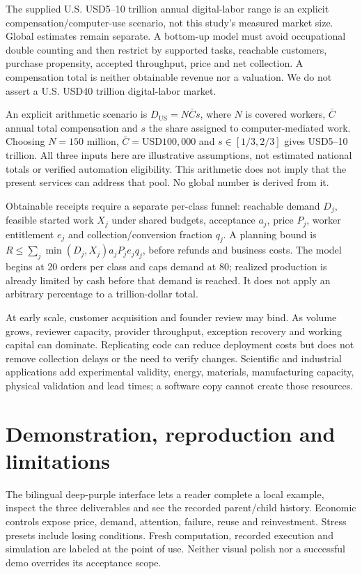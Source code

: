 \documentclass[11pt,a4paper]{article}
\begin{document}
The supplied U.S. USD5--10 trillion annual digital-labor range is an explicit compensation/computer-use scenario, not this study's measured market size. Global estimates remain separate. A bottom-up model must avoid occupational double counting and then restrict by supported tasks, reachable customers, purchase propensity, accepted throughput, price and net collection. A compensation total is neither obtainable revenue nor a valuation. We do not assert a U.S. USD40 trillion digital-labor market.

An explicit arithmetic scenario is $D_{\mathrm{US}}=N\bar C s$, where $N$ is covered workers, $\bar C$ annual total compensation and $s$ the share assigned to computer-mediated work. Choosing $N=150$ million, $\bar C=\mathrm{USD}100{,}000$ and $s\in[1/3,2/3]$ gives USD5--10 trillion. All three inputs here are illustrative assumptions, not estimated national totals or verified automation eligibility. This arithmetic does not imply that the present services can address that pool. No global number is derived from it.

Obtainable receipts require a separate per-class funnel: reachable demand $D_j$, feasible started work $X_j$ under shared budgets, acceptance $a_j$, price $P_j$, worker entitlement $e_j$ and collection/conversion fraction $q_j$. A planning bound is $R\leq\sum_j \min(D_j,X_j)a_jP_je_jq_j$, before refunds and business costs. The model begins at 20 orders per class and caps demand at 80; realized production is already limited by cash before that demand is reached. It does not apply an arbitrary percentage to a trillion-dollar total.

At early scale, customer acquisition and founder review may bind. As volume grows, reviewer capacity, provider throughput, exception recovery and working capital can dominate. Replicating code can reduce deployment costs but does not remove collection delays or the need to verify changes. Scientific and industrial applications add experimental validity, energy, materials, manufacturing capacity, physical validation and lead times; a software copy cannot create those resources.

\section{Demonstration, reproduction and limitations}
\label{sec:reproduction}
The bilingual deep-purple interface lets a reader complete a local example, inspect the three deliverables and see the recorded parent/child history. Economic controls expose price, demand, attention, failure, reuse and reinvestment. Stress presets include losing conditions. Fresh computation, recorded execution and simulation are labeled at the point of use. Neither visual polish nor a successful demo overrides its acceptance scope.
\end{document}
